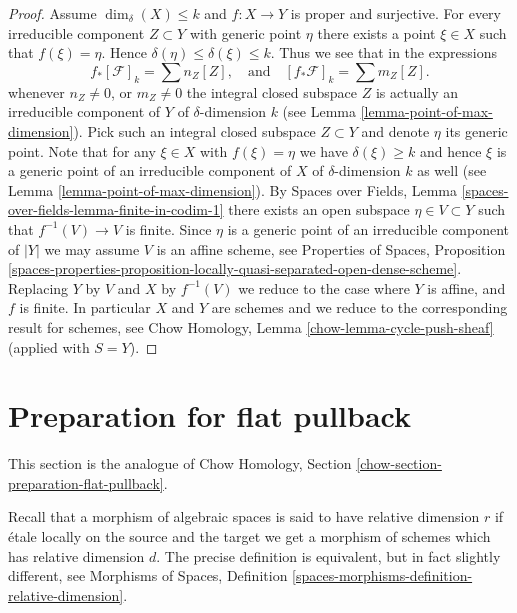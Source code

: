 \begin{proof}
\medskip\noindent
Assume $\dim_\delta(X) \leq k$ and $f : X \to Y$ is proper and surjective.
For every irreducible component $Z \subset Y$
with generic point $\eta$ there exists a point $\xi \in X$ such
that $f(\xi) = \eta$. Hence $\delta(\eta) \leq \delta(\xi) \leq k$.
Thus we see that in the expressions
$$
f_*[\mathcal{F}]_k = \sum n_Z[Z],
\quad
\text{and}
\quad
[f_*\mathcal{F}]_k = \sum m_Z[Z].
$$
whenever $n_Z \not = 0$, or $m_Z \not = 0$ the integral closed
subspace $Z$ is actually an irreducible component of $Y$ of
$\delta$-dimension $k$ (see Lemma \ref{lemma-point-of-max-dimension}).
Pick such an integral closed subspace $Z \subset Y$ and denote $\eta$
its generic point.
Note that for any $\xi \in X$ with $f(\xi) = \eta$ we have $\delta(\xi) \geq k$
and hence $\xi$ is a generic point of an irreducible component
of $X$ of $\delta$-dimension $k$ as well
(see Lemma \ref{lemma-point-of-max-dimension}).
By Spaces over Fields, Lemma \ref{spaces-over-fields-lemma-finite-in-codim-1}
there exists an open subspace $\eta \in V \subset Y$
such that $f^{-1}(V) \to V$ is finite.
Since $\eta$ is a generic point of an irreducible component of
$|Y|$ we may assume $V$ is an affine scheme, see
Properties of Spaces, Proposition
\ref{spaces-properties-proposition-locally-quasi-separated-open-dense-scheme}.
Replacing $Y$ by $V$ and $X$ by $f^{-1}(V)$ we reduce to the
case where $Y$ is affine, and $f$ is finite.
In particular $X$ and $Y$ are schemes and we reduce to
the corresponding result for schemes, see
Chow Homology, Lemma \ref{chow-lemma-cycle-push-sheaf}
(applied with $S = Y$).
\end{proof}













\section{Preparation for flat pullback}
\label{section-preparation-flat-pullback}

\noindent
This section is the analogue of
Chow Homology, Section \ref{chow-section-preparation-flat-pullback}.

\medskip\noindent
Recall that a morphism of algebraic spaces is said to have
relative dimension $r$ if \'etale locally on the source
and the target we get a morphism of schemes which has relative dimension $d$.
The precise definition is equivalent, but in fact slightly different, see
Morphisms of Spaces, Definition
\ref{spaces-morphisms-definition-relative-dimension}.

